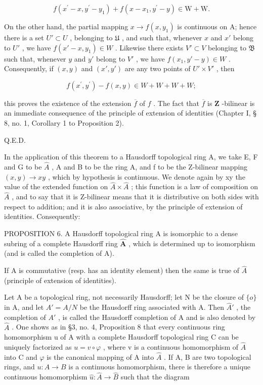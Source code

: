 \[
f \left(x ^ {\prime} - x, y ^ {\prime} - y _ {1}\right) + f \left(x - x _ {1}, y ^ {\prime} - y\right) \in \mathrm{W} + \mathrm{W}.
\]

On the other hand, the partial mapping \(x \to f(x, y_1)\) is continuous on A; hence there is a set \(U' \subset U\) , belonging to \(\mathfrak{U}\) , and such that, whenever \(x\) and \(x'\) belong to \(U'\) , we have \(f(x' - x, y_1) \in W\) . Likewise there exists \(V' \subset V\) belonging to \(\mathfrak{B}\) such that, whenever \(y\) and \(y'\) belong to \(V'\) , we have \(f(x_1, y' - y) \in W\) . Consequently, if \((x, y)\) and \((x', y')\) are any two points of \(U' \times V'\) , then

\[
f \left(x ^ {\prime}, y ^ {\prime}\right) - f (x, y) \in W + W + W + W;
\]

this proves the existence of the extension \(\overline{f}\) of \(f\) . The fact that \(\overline{f}\) is \(\mathbf{Z}\) -bilinear is an immediate consequence of the principle of extension of identities (Chapter I, § 8, no. 1, Corollary 1 to Proposition 2).

Q.E.D.

In the application of this theorem to a Hausdorff topological ring A, we take E, F and G to be \(\hat{A}\) , A and B to be the ring A, and f to be the Z-bilinear mapping \((x, y) \to xy\) , which by hypothesis is continuous. We denote again by xy the value of the extended function on \(\hat{A} \times \hat{A}\) ; this function is a law of composition on \(\hat{A}\) , and to say that it is Z-bilinear means that it is distributive on both sides with respect to addition; and it is also associative, by the principle of extension of identities. Consequently:

PROPOSITION 6. A Hausdorff topological ring A is isomorphic to a dense subring of a complete Hausdorff ring \(\hat{\mathbf{A}}\) , which is determined up to isomorphism (and is called the completion of A).

If A is commutative (resp. has an identity element) then the same is true of \(\hat{A}\) (principle of extension of identities).

Let A be a topological ring, not necessarily Hausdorff; let N be the closure of \(\{o\}\) in A, and let \(A' = A/N\) be the Hausdorff ring associated with A. Then \(\hat{A}'\) , the completion of \(A'\) , is called the Hausdorff completion of A and is also denoted by \(\hat{A}\) . One shows as in §3, no. 4, Proposition 8 that every continuous ring homomorphism u of A with a complete Hausdorff topological ring C can be uniquely factorized as \(u = v \circ \varphi\) , where v is a continuous homomorphism of \(\hat{A}\) into C and \(\varphi\) is the canonical mapping of A into \(\hat{A}\) . If A, B are two topological rings, and \(u : A \to B\) is a continuous homomorphism, there is therefore a unique continuous homomorphism \(\hat{u} : \hat{A} \to \hat{B}\) such that the diagram

